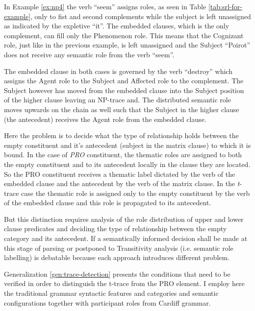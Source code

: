 In Example \ref{ex:np4} the verb ``seem'' assigns roles, as seen in Table \ref{tab:srl-for-example}, only to fist and second complements while the subject is left unassigned as indicated by the expletive ``it''. The embedded clauses, which is the only complement, can fill only the Phenomenon role. This means that the Cognizant role, just like in the previous example, is left unassigned and the Subject ``Poirot'' does not receive any semantic role from the verb ``seem''. 

The embedded clause in both cases is governed by the verb ``destroy'' which assigns the Agent role to the Subject and Affected role to the complement. The Subject however has moved from the embedded clause into the Subject position of the higher clause leaving an NP-trace and. The distributed semantic role moves upwards on the chain as well such that the Subject in the higher clause (the antecedent) receives the Agent role from the embedded clause. 


Here the problem is to decide what the type of relationship holds between the empty constituent and it's antecedent (subject in the matrix clause) to which it is bound. In the case of \textit{PRO} constituent, the thematic roles are assigned to both the empty constituent and to its antecedent locally in the clause they are located. So the PRO constituent receives a thematic label dictated by the verb of the embedded clause and the antecedent by the verb of the matrix clause. In the \textit{t}-trace case the thematic role is assigned only to the empty constituent by the verb of the embedded clause and this role is propagated to its antecedent. 

But this distinction requires analysis of the role distribution of upper and lower clause predicates and deciding the type of relationship between the empty category and its antecedent. 
If a semantically informed decision shall be made at this stage of parsing or postponed to Transitivity analysis (i.e. semantic role labelling) is debatable because each approach introduces different problem. 

Generalization \ref{gen:trace-detection} presents the conditions that need to be verified in order to distinguish the t-trace from the PRO element. I employ here the traditional grammar syntactic features and categories and semantic configurations together with participant roles from Cardiff grammar. 

